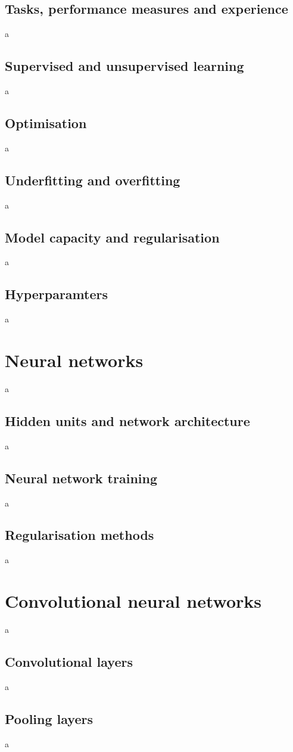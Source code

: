 \documentclass[12pt]{article}
\begin{document}
\subsection{Tasks, performance measures and experience}
a
\subsection{Supervised and unsupervised learning}
a
\subsection{Optimisation}
a
\subsection{Underfitting and overfitting}
a
\subsection{Model capacity and regularisation}
a
\subsection{Hyperparamters}
a
\section{Neural networks}
a
\subsection{Hidden units and network architecture}
a
\subsection{Neural network training}
a
\subsection{Regularisation methods}
a
\section{Convolutional neural networks}
a
\subsection{Convolutional layers}
a
\subsection{Pooling layers}
a
\end{document}
